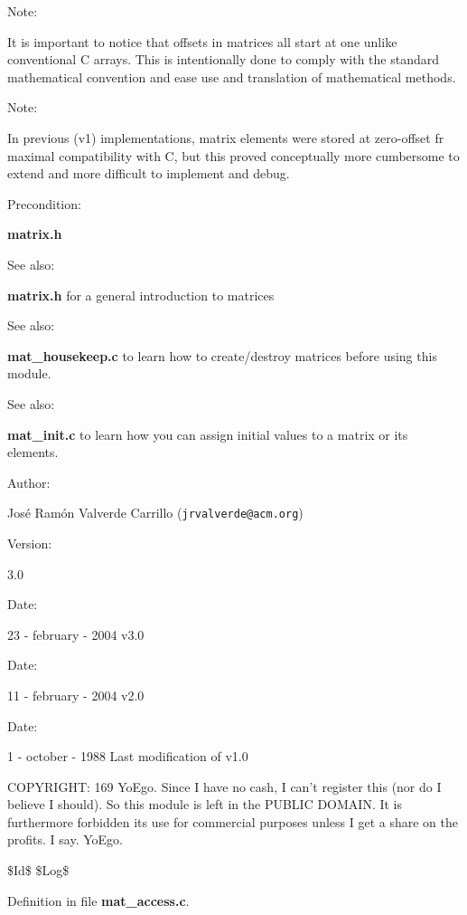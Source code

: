\begin{Desc}
\item[Note: ]\par
It is important to notice that offsets in matrices all start at  one unlike conventional C arrays. This is intentionally done to comply with the standard mathematical convention and ease use and translation of mathematical methods.\end{Desc}
\begin{Desc}
\item[Note: ]\par
In previous (v1) implementations, matrix elements were stored at zero-offset fr maximal compatibility with C, but this proved conceptually more cumbersome to extend and more difficult to  implement and debug.\end{Desc}
\begin{Desc}
\item[Precondition: ]\par
{\bf matrix.h}\end{Desc}
\begin{Desc}
\item[See also: ]\par
{\bf matrix.h} for a general introduction to matrices\end{Desc}
\begin{Desc}
\item[See also: ]\par
{\bf mat\_\-housekeep.c} to learn how to create/destroy matrices before using this module.\end{Desc}
\begin{Desc}
\item[See also: ]\par
{\bf mat\_\-init.c} to learn how you can assign initial values to a matrix or its elements.\end{Desc}
\begin{Desc}
\item[Author: ]\par
Jos\'{e} Ram\'{o}n Valverde Carrillo ({\tt jrvalverde@acm.org})\end{Desc}
\begin{Desc}
\item[Version: ]\par
3.0\end{Desc}
\begin{Desc}
\item[Date: ]\par
23 - february - 2004 v3.0\end{Desc}
\begin{Desc}
\item[Date: ]\par
11 - february - 2004 v2.0\end{Desc}
\begin{Desc}
\item[Date: ]\par
1 - october - 1988 Last modification of v1.0\end{Desc}
COPYRIGHT: 169 Yo\-Ego. Since I have no cash, I can't register this (nor do I believe I should). So this module is left in the PUBLIC DOMAIN. It is furthermore forbidden its use for commercial purposes unless I get a share on the profits. I say. Yo\-Ego.

\$Id\$ \$Log\$



Definition in file {\bf mat\_\-access.c}.